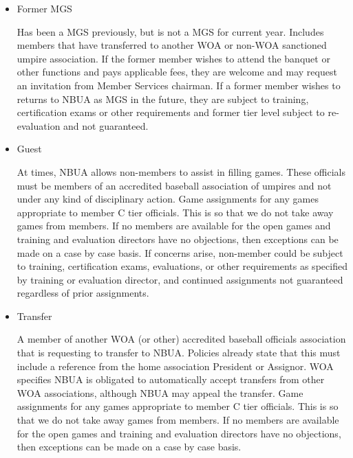 \documentclass[letterpaper,11pt,colorlinks=true,allcolors=blue]{article}
\begin{document}
\begin{itemize}
\item Former MGS

Has been a MGS previously, but is not a MGS for current year.  Includes members that have transferred to another WOA or non-WOA sanctioned umpire association.  If the former member wishes to attend the banquet or other functions and pays applicable fees, they are welcome and may request an invitation from Member Services chairman.  If a former member wishes to returns to NBUA as MGS in the future, they are subject to training, certification exams or other requirements and former tier level subject to re-evaluation and not guaranteed.

\item Guest

At times, NBUA allows non-members to assist in filling games.  These officials must be members of an accredited baseball association of umpires and not under any kind of disciplinary action.  Game assignments for any games appropriate to member C tier officials.  This is so that we do not take away games from members.  If no members are available for the open games and training and evaluation directors have no objections, then exceptions can be made on a case by case basis.  If concerns arise, non-member could be subject to training, certification exams, evaluations, or other requirements as specified by training or evaluation director, and continued assignments not guaranteed regardless of prior assignments.

\item Transfer

A member of another WOA (or other) accredited baseball officials association that is requesting to transfer to NBUA.  Policies already state that this must include a reference from the home association President or Assignor.  WOA specifies NBUA is obligated to automatically accept transfers from other WOA associations, although NBUA may appeal the transfer.  Game assignments for any games appropriate to member C tier officials.  This is so that we do not take away games from members.  If no members are available for the open games and training and evaluation directors have no objections, then exceptions can be made on a case by case basis.

\end{itemize}
\end{document}
